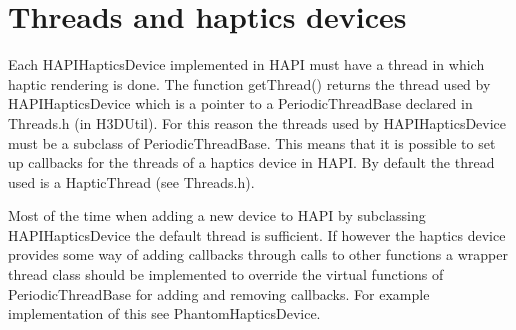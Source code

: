 \section{Threads and haptics devices}
Each HAPIHapticsDevice implemented in HAPI must have a thread in which haptic
rendering is done. The function getThread() returns the thread used by
HAPIHapticsDevice which is a pointer to a PeriodicThreadBase declared in 
Threads.h (in H3DUtil). For this reason the threads used by HAPIHapticsDevice
must be a subclass of PeriodicThreadBase. This means that it is possible to
set up callbacks for the threads of a haptics device in HAPI. By default the
thread used is a HapticThread (see Threads.h).

Most of the time when adding a
new device to HAPI by subclassing HAPIHapticsDevice the default thread is
sufficient. If however the haptics device provides some way of adding callbacks
through calls to other functions a wrapper thread class should be implemented
to override the virtual functions of PeriodicThreadBase for adding and removing
callbacks. For example implementation of this see PhantomHapticsDevice.